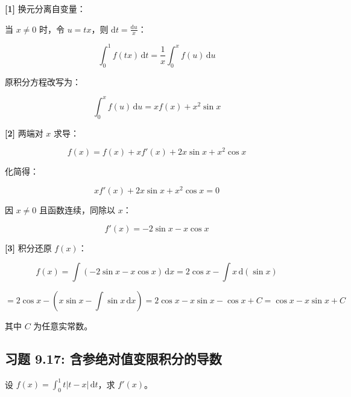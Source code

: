 \documentclass[11pt,a4paper,UTF8]{ctexart}
\begin{document}
\begin{solbox}[分步推导与答题规范]
\textbf{[1]} 换元分离自变量：

当 $x \neq 0$ 时，令 $u = tx$，则 $\mathrm{d}t = \frac{\mathrm{d}u}{x}$：


\begin{equation*}
\int_0^1 f(tx)\,\mathrm{d}t = \frac{1}{x}\int_0^x f(u)\,\mathrm{d}u
\end{equation*}


原积分方程改写为：


\begin{equation*}
\int_0^x f(u)\,\mathrm{d}u = x f(x) + x^2 \sin x
\end{equation*}


\textbf{[2]} 两端对 $x$ 求导：


\begin{equation*}
f(x) = f(x) + x f'(x) + 2x\sin x + x^2 \cos x
\end{equation*}


化简得：


\begin{equation*}
x f'(x) + 2x\sin x + x^2\cos x = 0
\end{equation*}


因 $x \neq 0$ 且函数连续，同除以 $x$：


\begin{equation*}
f'(x) = -2\sin x - x\cos x
\end{equation*}


\textbf{[3]} 积分还原 $f(x)$：


\begin{equation*}
f(x) = \int (-2\sin x - x\cos x)\,\mathrm{d}x = 2\cos x - \int x\,\mathrm{d}(\sin x)
\end{equation*}



\begin{equation*}
= 2\cos x - \left(x\sin x - \int \sin x\,\mathrm{d}x\right) = 2\cos x - x\sin x - \cos x + C = \cos x - x\sin x + C
\end{equation*}


其中 $C$ 为任意实常数。
\end{solbox}


\subsection{习题 9.17: 含参绝对值变限积分的导数}

设 $f(x) = \int_0^1 t|t-x|\,\mathrm{d}t$，求 $f'(x)$。
\end{document}
